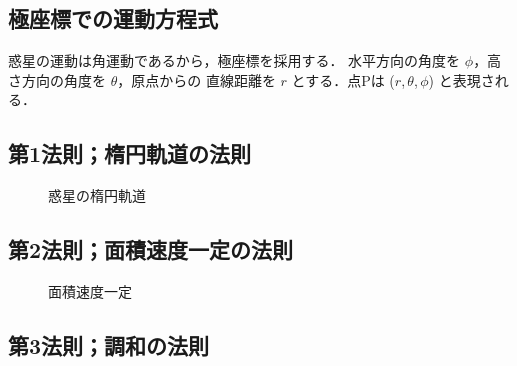         \subsection{極座標での運動方程式}
            惑星の運動は角運動であるから，極座標を採用する．
            水平方向の角度を $\phi$，高さ方向の角度を $\theta$，原点からの
            直線距離を $r$ とする．点Pは ($r$,\,$\theta$,\,$\phi$) と表現される．

        \subsection{第1法則；楕円軌道の法則}
        \begin{figure}[hbt]
            \begin{center}
                \caption{惑星の楕円軌道}
                \label{fig:wakusei_kepler_low}
            \end{center}
        \end{figure}

        \subsection{第2法則；面積速度一定の法則}
        \begin{figure}[hbt]
            \begin{center}
                \caption{面積速度一定}
                \label{fig:wakusei_kepler_low}
            \end{center}
        \end{figure}

        \subsection{第3法則；調和の法則}

